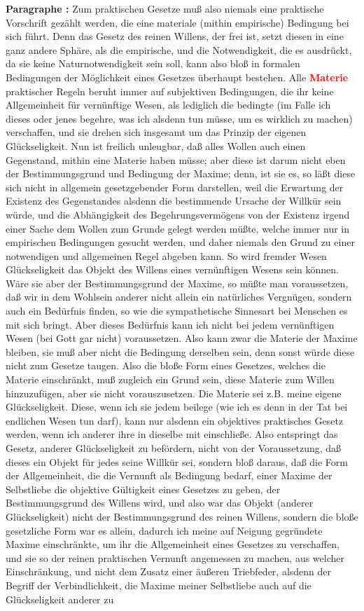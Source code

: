 \documentclass[a4paper,12pt,twoside]{book}
\newcommand{\match}[1]{\textcolor{red}{\textbf{#1}}}
\begin{document}
	\noindent\textbf{Paragraphe : }Zum praktischen Gesetze muß also niemals eine praktische Vorschrift gezählt werden, die eine materiale (mithin empirische) Bedingung bei sich führt. Denn das Gesetz des reinen Willens, der frei ist, setzt diesen in eine ganz andere Sphäre, als die empirische, und die Notwendigkeit, die es ausdrückt, da sie keine Naturnotwendigkeit sein soll, kann also bloß in formalen Bedingungen der Möglichkeit eines Gesetzes überhaupt bestehen. Alle \match{Materie} praktischer Regeln beruht immer auf subjektiven Bedingungen, die ihr keine Allgemeinheit für vernünftige Wesen, als lediglich die bedingte (im Falle ich dieses oder jenes begehre, was ich alsdenn tun müsse, um es wirklich zu machen) verschaffen, und sie drehen sich insgesamt um das Prinzip der eigenen Glückseligkeit. Nun ist freilich unleugbar, daß alles Wollen auch einen Gegenstand, mithin eine Materie haben müsse; aber diese ist darum nicht eben der Bestimmungsgrund und Bedingung der Maxime; denn, ist sie es, so läßt diese sich nicht in allgemein gesetzgebender Form darstellen, weil die Erwartung der Existenz des Gegenstandes alsdenn die bestimmende Ursache der Willkür sein würde, und die Abhängigkeit des Begehrungsvermögens von der Existenz irgend einer Sache dem Wollen zum Grunde gelegt werden müßte, welche immer nur in empirischen Bedingungen gesucht werden, und daher niemals den Grund zu einer notwendigen und allgemeinen Regel abgeben kann. So wird fremder Wesen Glückseligkeit das Objekt des Willens eines vernünftigen Wesens sein können. Wäre sie aber der Bestimmungsgrund der Maxime, so müßte man voraussetzen, daß wir in dem Wohlsein anderer nicht allein ein natürliches Vergnügen, sondern auch ein Bedürfnis finden, so wie die sympathetische Sinnesart bei Menschen es mit sich bringt. Aber dieses Bedürfnis kann ich nicht bei jedem vernünftigen Wesen (bei Gott gar nicht) voraussetzen. Also kann zwar die Materie der Maxime bleiben, sie muß aber nicht die Bedingung  derselben sein, denn sonst würde diese nicht zum Gesetze taugen. Also die bloße Form eines Gesetzes, welches die Materie einschränkt, muß zugleich ein Grund sein, diese Materie zum Willen hinzuzufügen, aber sie nicht vorauszusetzen. Die Materie sei z.B. meine eigene Glückseligkeit. Diese, wenn ich sie jedem beilege (wie ich es denn in der Tat bei endlichen Wesen tun darf), kann nur alsdenn ein objektives praktisches Gesetz werden, wenn ich anderer ihre in dieselbe mit einschließe. Also entspringt das Gesetz, anderer Glückseligkeit zu befördern, nicht von der Voraussetzung, daß dieses ein Objekt für jedes seine Willkür sei, sondern bloß daraus, daß die Form der Allgemeinheit, die die Vernunft als Bedingung bedarf, einer Maxime der Selbstliebe die objektive Gültigkeit eines Gesetzes zu geben, der Bestimmungsgrund des Willens wird, und also war das Objekt (anderer Glückseligkeit) nicht der Bestimmungsgrund des reinen Willens, sondern die bloße gesetzliche Form war es allein, dadurch ich meine auf Neigung gegründete Maxime einschränkte, um ihr die Allgemeinheit eines Gesetzes zu verschaffen, und sie so der reinen praktischen Vernunft angemessen zu machen, aus welcher Einschränkung, und nicht dem Zusatz einer äußeren Triebfeder, alsdenn der Begriff der Verbindlichkeit, die Maxime meiner Selbstliebe auch auf die Glückseligkeit anderer zu 
\end{document}
